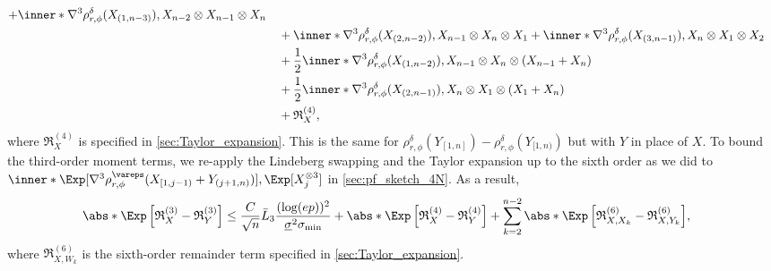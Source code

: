 \documentclass[aos]{imsart}
\begin{document}
\begin{appendix}
\begin{equation}
\begin{aligned}
    + \inner*{\nabla^3 \rho_{r,\phi}^\delta(X_{(1,n-3)}), X_{n-2} \otimes X_{n-1} \otimes X_n} \\
    & \quad + \inner*{\nabla^3 \rho_{r,\phi}^\delta(X_{(2,n-2)}),  X_{n-1} \otimes X_{n} \otimes X_1} 
    + \inner*{\nabla^3 \rho_{r,\phi}^\delta(X_{(3,n-1)}),  X_{n} \otimes X_{1} \otimes X_2} \\
    & \quad + \frac{1}{2} \inner*{
        \nabla^3 \rho_{r,\phi}^\delta(X_{(1,n-2)}), 
        X_{n-1} \otimes X_n \otimes (X_{n-1} + X_n)
    } \\
    & \quad + \frac{1}{2} \inner*{
        \nabla^3 \rho_{r,\phi}^\delta(X_{(2,n-1)}), 
        X_{n} \otimes X_1 \otimes (X_1 + X_n)
    } \\
    & \quad + \mathfrak{R}_X^{(4)},
\end{aligned}
\end{equation}
where $\mathfrak{R}_X^{(4)}$ is specified in \cref{sec:Taylor_expansion}. This is the same for $\rho_{r,\phi}^{\delta}(Y_{[1,n]}) - \rho_{r,\phi}^\delta(Y_{[1,n)})$ but with $Y$ in place of $X$. 
To bound the third-order moment terms, we re-apply the Lindeberg swapping and the Taylor expansion up to the sixth order as we did to $ \inner*{ 
    \Exp[ \nabla^3 \rho_{r,\phi}^\vareps(X_{[1,j-1)} + Y_{(j+1,n)}) ], 
    \Exp[ X_j^{\otimes 3} ]
}$ in \cref{sec:pf_sketch_4N}. As a result,
\begin{equation*}
\begin{aligned}
    & \abs*{ \Exp\left[ \mathfrak{R}_X^{(3)} - \mathfrak{R}_Y^{(3)} \right] } 
    \leq \frac{C}{\sqrt{n}} \bar{L}_{3} \frac{(\log(ep))^2}{\underline\sigma^2 \sigma_{\min}}
    + \abs*{ \Exp\left[ \mathfrak{R}_X^{(4)} - \mathfrak{R}_Y^{(4)} \right] }
    + \sum_{k=2}^{n-2} \abs*{\Exp \left[ 
        \mathfrak{R}_{X,X_k}^{(6)}
        - \mathfrak{R}_{X,Y_k}^{(6)}
    \right] },
\end{aligned}
\end{equation*}
where $\mathfrak{R}_{X,W_k}^{(6)}$ is the sixth-order remainder term specified in \cref{sec:Taylor_expansion}.


\end{appendix}
\end{document}

